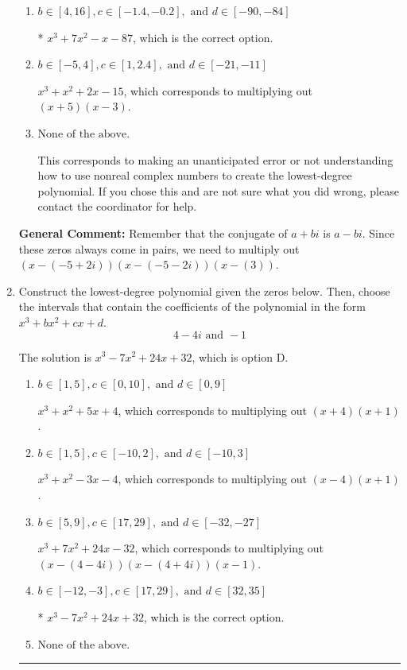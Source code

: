 \documentclass{extbook}[14pt]
\newcommand{\litem}[1]{\item #1

\rule{\textwidth}{0.4pt}}
\begin{document}
\begin{enumerate}
{\begin{enumerate}[label=\Alph*.]
$x^{3} -7 x^{2} -x + 87$, which corresponds to multiplying out $(x-(-5 + 2 i))(x-(-5 - 2 i))(x + 3)$.
\item \( b \in [4, 16], c \in [-1.4, -0.2], \text{ and } d \in [-90, -84] \)

* $x^{3} +7 x^{2} -x -87$, which is the correct option.
\item \( b \in [-5, 4], c \in [1, 2.4], \text{ and } d \in [-21, -11] \)

$x^{3} + x^{2} +2 x -15$, which corresponds to multiplying out $(x + 5)(x -3)$.
\item \( \text{None of the above.} \)

This corresponds to making an unanticipated error or not understanding how to use nonreal complex numbers to create the lowest-degree polynomial. If you chose this and are not sure what you did wrong, please contact the coordinator for help.
\end{enumerate}

\textbf{General Comment:} Remember that the conjugate of $a+bi$ is $a-bi$. Since these zeros always come in pairs, we need to multiply out $(x-(-5 + 2 i))(x-(-5 - 2 i))(x-(3))$.
}
\litem{
Construct the lowest-degree polynomial given the zeros below. Then, choose the intervals that contain the coefficients of the polynomial in the form $x^3+bx^2+cx+d$.
\[ 4 - 4 i \text{ and } -1 \]

The solution is \( x^{3} -7 x^{2} +24 x + 32 \), which is option D.\begin{enumerate}[label=\Alph*.]
\item \( b \in [1, 5], c \in [0, 10], \text{ and } d \in [0, 9] \)

$x^{3} + x^{2} +5 x + 4$, which corresponds to multiplying out $(x + 4)(x + 1)$.
\item \( b \in [1, 5], c \in [-10, 2], \text{ and } d \in [-10, 3] \)

$x^{3} + x^{2} -3 x -4$, which corresponds to multiplying out $(x -4)(x + 1)$.
\item \( b \in [5, 9], c \in [17, 29], \text{ and } d \in [-32, -27] \)

$x^{3} +7 x^{2} +24 x -32$, which corresponds to multiplying out $(x-(4 - 4 i))(x-(4 + 4 i))(x -1)$.
\item \( b \in [-12, -3], c \in [17, 29], \text{ and } d \in [32, 35] \)

* $x^{3} -7 x^{2} +24 x + 32$, which is the correct option.
\item \( \text{None of the above.} \)


\end{enumerate}}
\end{enumerate}
\end{document}
